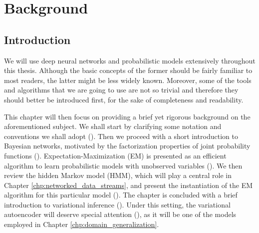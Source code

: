 
\chapter{Background}


\label{chp:background}


\section{Introduction}
\label{sec:background_intro}
We will use deep neural networks and probabilistic models extensively throughout this thesis. Although the basic concepts of the former should be fairly familiar to most readers, the latter might be less widely known. Moreover, some of the tools and algorithms that we are going to use are not so trivial and therefore they should better be introduced first, for the sake of completeness and readability.

This chapter will then focus on providing a brief yet rigorous background on the aforementioned subject. We shall start by clarifying some notation and conventions we shall adopt (). Then we proceed with a short introduction to Bayesian networks, motivated by the factorization properties of joint probability functions (\Secref{}). Expectation-Maximization (EM) is presented as an efficient algorithm to learn probabilistic models with unobserved variables (\Secref{}). We then review the hidden Markov model (HMM), which will play a central role in Chapter \ref{chp:networked_data_streams}, and present the instantiation of the EM algorithm for this particular model (\Secref{}). The chapter is concluded with a brief introduction to variational inference (\Secref{}). Under this setting, the variational autoencoder will deserve special attention (\Secref{}), as it will be one of the models employed in Chapter \ref{chp:domain_generalization}.

